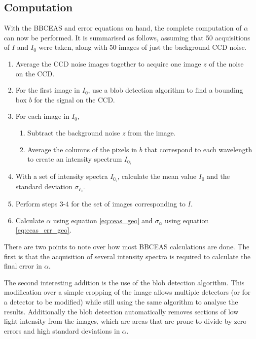 \subsection{Computation}


With the \ac{BBCEAS} and error equations on hand, the complete computation of
$\alpha$ can now be performed. It is summarised as follows, assuming that 50
acquisitions of $I$ and $I_0$ were taken, along with 50 images of just the
background \ac{CCD} noise.

\begin{enumerate}
  \item Average the \ac{CCD} noise images together to acquire one image $z$
        of the noise on the \ac{CCD}.
  \item For the first image in $I_0$, use a blob detection algorithm to find
        a bounding box $b$ for the signal on the \ac{CCD}.
  \item For each image in $I_0$,
    \begin{enumerate}
      \item Subtract the background noise $z$ from the image.
      \item Average the columns of the pixels in $b$ that correspond to each
        wavelength to create an intensity spectrum $I_{0_{i}}$
    \end{enumerate}
  \item With a set of intensity spectra $I_{0_i}$, calculate the mean value
        $I_0$ and the standard deviation $\sigma_{I_0}$.
  \item Perform steps 3-4 for the set of images corresponding to $I$.
  \item Calculate $\alpha$ using equation \eqref{eq:ceas_geo} and
    $\sigma_\alpha$ using equation \eqref{eq:ceas_err_geo}.
\end{enumerate}

There are two points to note over how most \ac{BBCEAS} calculations are done.
The first is that the acquisition of several intensity spectra is required to
calculate the final error in $\alpha$.

The second interesting addition is the use of the blob detection algorithm.
This modification over a simple cropping of the image allows multiple
detectors (or for a detector to be modified) while still using the same
algorithm to analyse the results. Additionally the blob detection
automatically removes sections of low light intensity from the images, which
are areas that are prone to divide by zero errors and high standard deviations
in $\alpha$.


